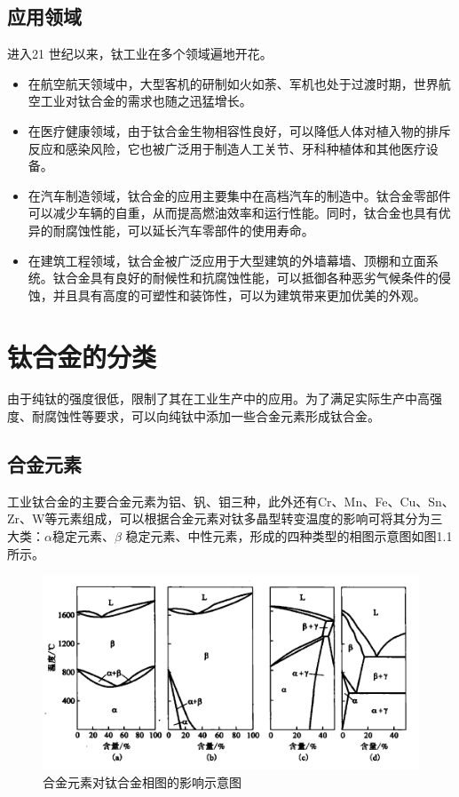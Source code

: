 \subsection{应用领域}

进入21 世纪以来，钛工业在多个领域遍地开花。
\begin{itemize}
	\item 	在航空航天领域中，大型客机的研制如火如荼、军机也处于过渡时期，世界航空工业对钛合金的需求也随之迅猛增长。
	\item 在医疗健康领域，由于钛合金生物相容性良好，可以降低人体对植入物的排斥反应和感染风险，它也被广泛用于制造人工关节、牙科种植体和其他医疗设备。
	\item 在汽车制造领域，钛合金的应用主要集中在高档汽车的制造中。钛合金零部件可以减少车辆的自重，从而提高燃油效率和运行性能。同时，钛合金也具有优异的耐腐蚀性能，可以延长汽车零部件的使用寿命。
	\item 在建筑工程领域，钛合金被广泛应用于大型建筑的外墙幕墙、顶棚和立面系统。钛合金具有良好的耐候性和抗腐蚀性能，可以抵御各种恶劣气候条件的侵蚀，并且具有高度的可塑性和装饰性，可以为建筑带来更加优美的外观。

\end{itemize}
\section{钛合金的分类}
\label{sec:1.1}
由于纯钛的强度很低，限制了其在工业生产中的应用。为了满足实际生产中高强度、耐腐蚀性等要求，可以向纯钛中添加一些合金元素形成钛合金。
\subsection*{合金元素}
工业钛合金的主要合金元素为铝、钒、钼三种，此外还有Cr、Mn、Fe、Cu、Sn、Zr、W等元素组成，可以根据合金元素对钛多晶型转变温度的影响可将其分为三大类：$\alpha$稳定元素、$\beta$ 稳定元素、中性元素，形成的四种类型的相图示意图如图1.1所示。
\begin{figure}[h!]
	\centering
	\includegraphics[width=0.9\linewidth]{pic/01}
	\caption{合金元素对钛合金相图的影响示意图}
	\label{fig:01}
\end{figure}

